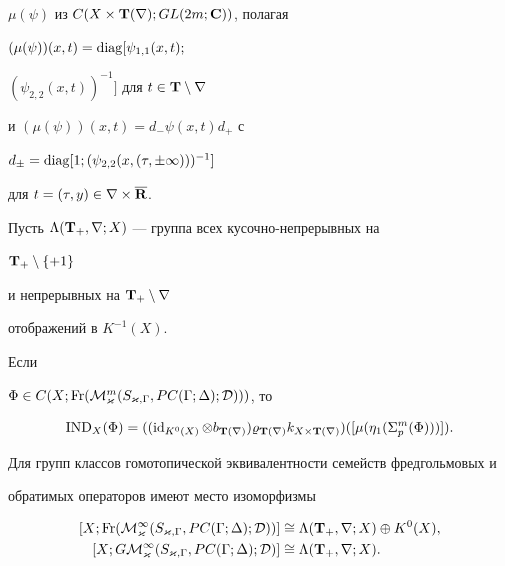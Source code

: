 $\mu (\psi)$ из $C(X\times {\bold T} (\nabla);GL(2m;{\bold C}))$, полагая


$(\mu (\psi))(x,t)=\operatorname{diag}[\psi_{1,1}(x,t);$




$(\psi_{2,2}(x,t))^{-1}]$ для $t\in{\bold T}\setminus\nabla$


и $(\mu (\psi))(x,t)=d_- \psi (x,t)d_+$ с


$d_{\pm}=\operatorname{diag}[1;(\psi_{2,2}(x,(\tau,\pm\infty)))^{-1}]$


для $t=(\tau,y)\in \nabla \times\overline {{\bold R}}$.


Пусть $\Lambda ({\bold T}_+,\nabla;X)$ --- группа всех кусочно-непрерывных на


${\bold T}_+ \setminus \{+1\}$


и непрерывных на ${\bold T}_+ \setminus \nabla$


отображений в $K^{-1}(X)$.





\begin{thm}


Если


$\Phi\in C(X;\Fr({\cal M}^m_{\varkappa} (S_{\varkappa,\Gamma},PC(\Gamma;


\Delta);{\cal D})))$, то


$$


\IND_X(\Phi)=((\ID_{K^0(X)}\otimes b_{{\bold T} (\nabla)})


\varrho_{{\bold T} (\nabla)} k_{X\times{\bold T}(\nabla)})([ \mu (\eta


_1(\Sigma^m_p (\Phi)))]).


$$


Для групп классов гомотопической эквивалентности семейств фредгольмовых и


обратимых операторов имеют место изоморфизмы


\begin{align*}


[X;\Fr({\cal M}^{\infty}_{\varkappa}


(S_{\varkappa,\Gamma},PC(\Gamma;\Delta);


{\cal D}))] &\cong


\Lambda ({\bold T}_+,\nabla;X)\oplus K^0(X), \\


%


[X;G{\cal M}^{\infty}_{\varkappa} (S_{\varkappa,\Gamma},PC(\Gamma;\Delta);


{\cal D})]&\cong \Lambda ({\bold T}_+,\nabla;X).


\end{align*}


\end{thm}





